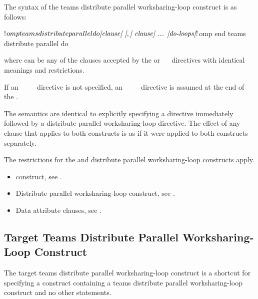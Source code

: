 \begin{fortranspecific}
The syntax of the teams distribute parallel worksharing-loop construct is as follows:

\begin{ompfPragma}
!$omp teams distribute parallel do \plc{[clause[ [},\plc{] clause] ... ]}
   \plc{do-loops}
\plc{[} !$omp end teams distribute parallel do \plc{]}
\end{ompfPragma}

where  can be any of the clauses accepted by the  or
~~ directives with identical meanings and restrictions.

If an ~~~~ directive is not specified, an
~~~~ directive is assumed at the end of the .
\end{fortranspecific}

\descr
The semantics are identical to explicitly specifying a  directive immediately
followed by a distribute parallel worksharing-loop directive. The effect of any clause that applies to
both constructs is as if it were applied to both constructs separately.

\restrictions
The restrictions for the  and distribute parallel worksharing-loop constructs apply.

\crossreferences
\begin{itemize}
\item {} construct, see
.

\item Distribute parallel worksharing-loop construct, see
.

\item Data attribute clauses, see
.
\end{itemize}









\subsection{Target Teams Distribute Parallel Worksharing-Loop Construct}
\label{subsec:Target Teams Distribute Parallel Worksharing-Loop Construct}
\summary
The target teams distribute parallel worksharing-loop construct is a shortcut for specifying a 
construct containing a teams distribute parallel worksharing-loop construct and no other statements.

